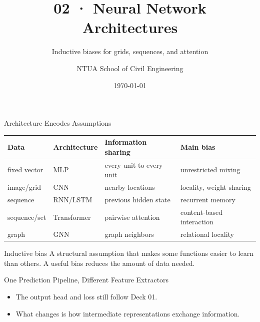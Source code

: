 \documentclass[10pt,aspectratio=169]{ntuabeamer}
\title{02 · Neural Network Architectures}
\subtitle{Inductive biases for grids, sequences, and attention}
\author{NTUA School of Civil Engineering}
\date{\today}
\begin{document}
\begin{frame}[plain]
  \makepresentationtitle
\end{frame}

\begin{frame}{Architecture Encodes Assumptions}
  \centering
  \small
  \begin{tabular}{llll}
    \toprule
    Data & Architecture & Information sharing & Main bias \\
    \midrule
    fixed vector & MLP & every unit to every unit & unrestricted mixing \\
    image/grid & CNN & nearby locations & locality, weight sharing \\
    sequence & RNN/LSTM & previous hidden state & recurrent memory \\
    sequence/set & Transformer & pairwise attention & content-based interaction \\
    graph & GNN & graph neighbors & relational locality \\
    \bottomrule
  \end{tabular}
  \vspace{0.45cm}
  \begin{block}{Inductive bias}
    A structural assumption that makes some functions easier to learn than others. A useful bias reduces the amount of data needed.
  \end{block}
\end{frame}

\begin{frame}{One Prediction Pipeline, Different Feature Extractors}
  \begin{center}
  \end{center}
  \begin{itemize}
    \item The output head and loss still follow Deck 01.
    \item What changes is how intermediate representations exchange information.
  \end{itemize}
\end{frame}
\end{document}
